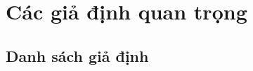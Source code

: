 \section{Các giả định quan trọng}
\subsection{Danh sách giả định}
\small
\setlength{\tabcolsep}{4pt}
\renewcommand{\arraystretch}{0.95}
